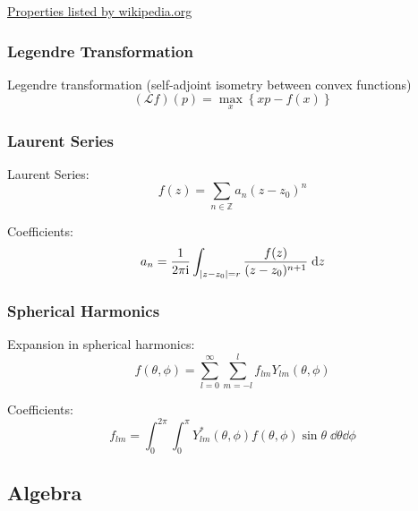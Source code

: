 			\noindent
			\href{https://en.wikipedia.org/wiki/Fourier_transform#Functional_relationships,_one-dimensional}{Properties listed by wikipedia.org}

		\subsubsection{Legendre Transformation}
			\noindent
			Legendre transformation (self-adjoint isometry between convex functions)
			\begin{equation}
				(\mathcal{L}f)(p)=\max_x\left\lbrace xp-f(x) \right\rbrace
			\end{equation}


		\subsubsection{Laurent Series}
			\noindent
			Laurent Series:
			\begin{equation}
				f(z)=\sum_{n\in\mathbb{Z}} a_n(z-z_0)^n
			\end{equation}

			\noindent
			Coefficients:
			\begin{equation}
				a_n = \frac{1}{2 \pi \mathrm{i}}\int_{\abs{ z-z_0 } = r} \frac{f(z)}{(z-z_0)^{n+1}}\;\dd z
			\end{equation}

		\subsubsection{Spherical Harmonics}
			\noindent
			Expansion in spherical harmonics:
			\begin{equation}
				f(\theta, \phi) = \sum_{l=0}^{\infty} \sum_{m=-l}^{l} f_{lm} Y_{lm}(\theta,\phi)
			\end{equation}

			\noindent
			Coefficients:
			\begin{equation}
				f_{lm} = \int_0^{2\pi} \int_0^\pi Y_{lm}^{*}(\theta,\phi) f(\theta,\phi) \sin\theta\;\dd\theta\dd\phi
			\end{equation}

	\subsection{Algebra}			
